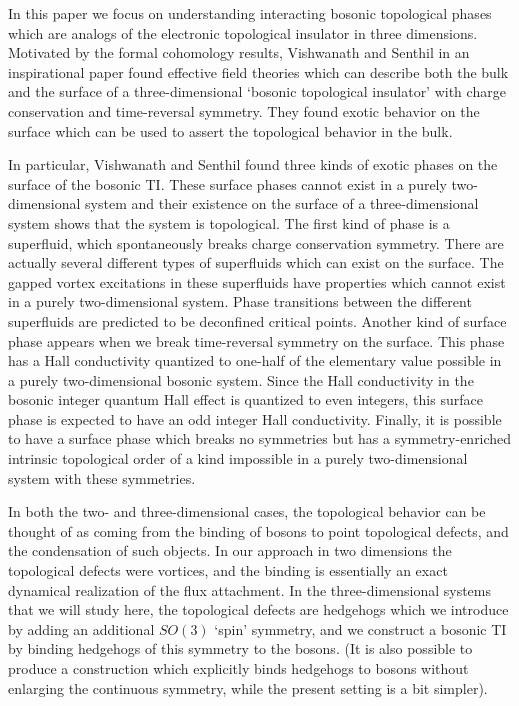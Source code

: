 \documentclass[prb,twocolumn]{revtex4-1}
\begin{document}
In this paper we focus on understanding interacting bosonic topological phases which are analogs of the electronic topological insulator in three dimensions. Motivated by the formal cohomology results,\cite{WenScience,*WenPRB} Vishwanath and Senthil in an inspirational paper\cite{SenthilVishwanath} found effective field theories which can describe both the bulk and the surface of a three-dimensional `bosonic topological insulator' with charge conservation and time-reversal symmetry. They found exotic behavior on the surface which can be used to assert the topological behavior in the bulk.

In particular, Vishwanath and Senthil found three kinds of exotic phases on the surface of the bosonic TI. These surface phases cannot exist in a purely two-dimensional system and their existence on the surface of a three-dimensional system shows that the system is topological. The first kind of phase is a superfluid, which spontaneously breaks charge conservation symmetry. There are actually several different types of superfluids which can exist on the surface. The gapped vortex excitations in these superfluids have properties which cannot exist in a purely two-dimensional system.  Phase transitions between the different superfluids are predicted to be deconfined critical points. Another kind of surface phase appears when we break time-reversal symmetry on the surface. This phase has a Hall conductivity quantized to one-half of the elementary value possible in a purely two-dimensional bosonic system. Since the Hall conductivity in the bosonic integer quantum Hall effect is quantized to even integers, this surface phase is expected to have an odd integer Hall conductivity. Finally, it is possible to have a surface phase which breaks no symmetries but has a symmetry-enriched intrinsic topological order of a kind impossible in a purely two-dimensional system with these symmetries.

In both the two- and three-dimensional cases, the topological behavior can be thought of as coming from the binding of bosons to point topological defects, and the condensation of such objects. In our approach in two dimensions the topological defects were vortices, and the binding is essentially an exact dynamical realization of the flux attachment. In the three-dimensional systems that we will study here, the topological defects are hedgehogs which we introduce by adding an additional $SO(3)$ `spin' symmetry, and we construct a bosonic TI by binding hedgehogs of this symmetry to the bosons.\cite{SenthilVishwanath} 
(It is also possible to produce a construction which explicitly binds hedgehogs to bosons without enlarging the continuous symmetry,\cite{Max} while the present setting is a bit simpler).
\end{document}
